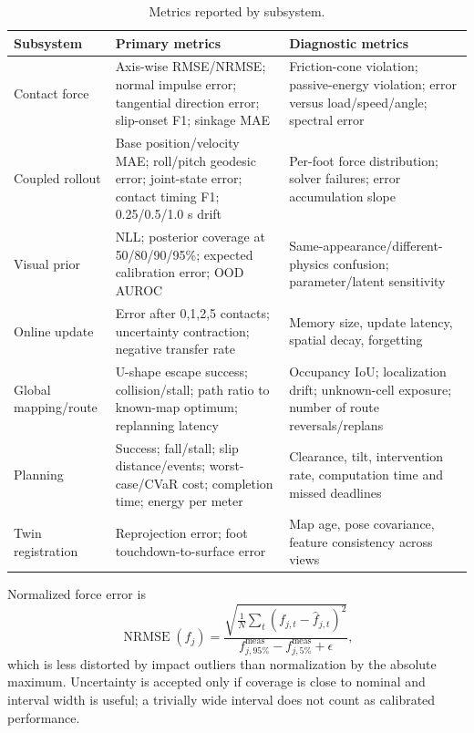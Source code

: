 \begin{table}[ht]
\centering
\caption{Metrics reported by subsystem.}
\label{tab:metrics}
\small
\begin{tabularx}{\textwidth}{@{}L{27mm}Y Y@{}}
\toprule
\textbf{Subsystem} & \textbf{Primary metrics} & \textbf{Diagnostic metrics}\\
\midrule
Contact force & Axis-wise RMSE/NRMSE; normal impulse error; tangential direction error; slip-onset F1; sinkage MAE & Friction-cone violation; passive-energy violation; error versus load/speed/angle; spectral error\\
Coupled rollout & Base position/velocity MAE; roll/pitch geodesic error; joint-state error; contact timing F1; 0.25/0.5/1.0 s drift & Per-foot force distribution; solver failures; error accumulation slope\\
Visual prior & NLL; posterior coverage at 50/80/90/95\%; expected calibration error; OOD AUROC & Same-appearance/different-physics confusion; parameter/latent sensitivity\\
Online update & Error after 0,1,2,5 contacts; uncertainty contraction; negative transfer rate & Memory size, update latency, spatial decay, forgetting\\
Global mapping/route & U-shape escape success; collision/stall; path ratio to known-map optimum; replanning latency & Occupancy IoU; localization drift; unknown-cell exposure; number of route reversals/replans\\
Planning & Success; fall/stall; slip distance/events; worst-case/CVaR cost; completion time; energy per meter & Clearance, tilt, intervention rate, computation time and missed deadlines\\
Twin registration & Reprojection error; foot touchdown-to-surface error & Map age, pose covariance, feature consistency across views\\
\bottomrule
\end{tabularx}
\end{table}

Normalized force error is
\begin{equation}
\operatorname{NRMSE}(f_j)=
\frac{\sqrt{\frac{1}{N}\sum_t(f_{j,t}-\hat f_{j,t})^2}}
{f_{j,95\%}^{\mathrm{meas}}-f_{j,5\%}^{\mathrm{meas}}+\epsilon},
\label{eq:nrmse}
\end{equation}
which is less distorted by impact outliers than normalization by the absolute maximum. Uncertainty is accepted only if coverage is close to nominal and interval width is useful; a trivially wide interval does not count as calibrated performance.

